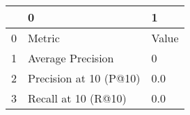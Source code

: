 \begin{tabular}{lll}
\toprule
{} &                       0 &      1 \\
\midrule
0 &                  Metric &  Value \\
1 &       Average Precision &      0 \\
2 &  Precision at 10 (P@10) &    0.0 \\
3 &     Recall at 10 (R@10) &    0.0 \\
\bottomrule
\end{tabular}
